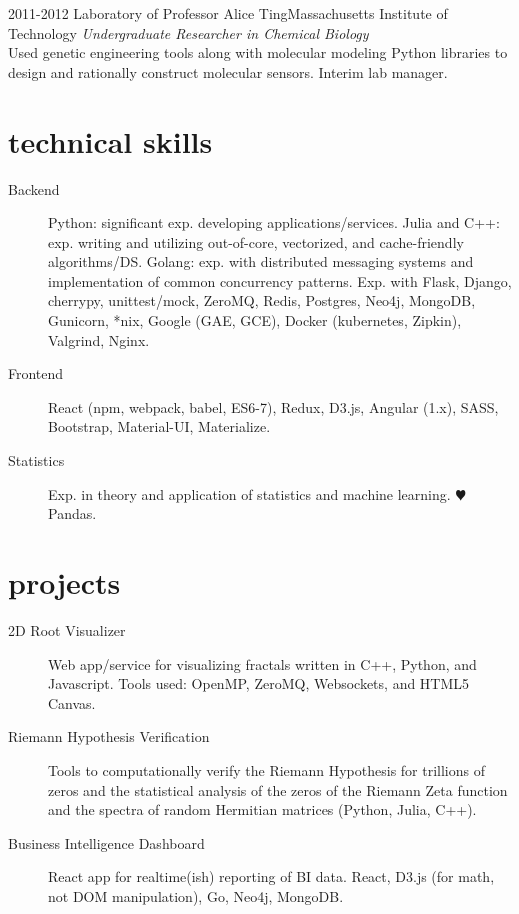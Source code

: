 \documentclass[11pt]{friggeri-cv} %
\begin{document}
\begin{entrylist}
\entry
{2011-2012}
{Laboratory of Professor Alice Ting}{Massachusetts Institute of Technology}
{\emph{Undergraduate Researcher in Chemical Biology} \\
Used genetic engineering tools along with molecular modeling Python libraries to design and rationally construct molecular sensors. Interim lab manager.}
\end{entrylist}


\section{technical skills}
\begin{description}
\item[Backend] Python: significant exp. developing applications/services. Julia and C++: exp. writing and utilizing out-of-core, vectorized, and cache-friendly algorithms/DS. Golang: exp. with distributed messaging systems and implementation of common concurrency patterns. Exp. with Flask, Django, cherrypy, 
unittest/mock,
ZeroMQ,
Redis,
Postgres,
Neo4j,
MongoDB,
Gunicorn,
*nix,
Google (GAE, GCE),
Docker (kubernetes, Zipkin),
Valgrind,
Nginx.
\item[Frontend]
React (npm, webpack, babel, ES6-7),
Redux,
D3.js,
Angular (1.x),
SASS,
Bootstrap,
Material-UI,
Materialize.
\item[Statistics] Exp. in theory and application of statistics and machine learning. {\color{red} $\varheartsuit$} Pandas.
\end{description}

\section{projects}
\begin{description}
\item[2D Root Visualizer] Web app/service for visualizing fractals written in C++, Python, and Javascript. Tools used: OpenMP, ZeroMQ, Websockets, and HTML5 Canvas.
\item[Riemann Hypothesis Verification] Tools to computationally verify the Riemann Hypothesis for trillions of zeros and the statistical analysis of the zeros of the Riemann Zeta function and the spectra of random Hermitian matrices (Python, Julia, C++).
\item[Business Intelligence Dashboard] React app for realtime(ish) reporting of BI data. React, D3.js (for math, not DOM manipulation), Go, Neo4j, MongoDB.
\end{description}
\end{document}
